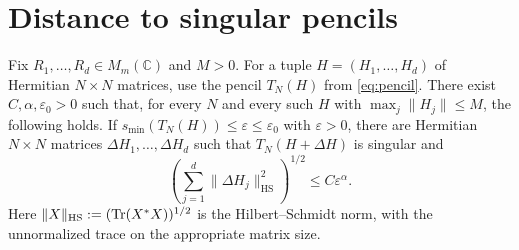 \section{Distance to singular pencils}\label{sec:distance}

\begin{proposition}\label{prop:distance}
Fix $R_1,\ldots,R_d\in M_m(\mathbb C)$ and $M>0$.
For a tuple $H=(H_1,\ldots,H_d)$ of Hermitian $N\times N$ matrices, use the pencil $T_N(H)$ from \eqref{eq:pencil}.
There exist $C,\alpha,\varepsilon_0>0$ such that, for every $N$ and every such $H$ with $\max_j\|H_j\|\le M$, the following holds.
If $s_{\min}(T_N(H))\le\varepsilon\le\varepsilon_0$ with $\varepsilon>0$, there are Hermitian $N\times N$ matrices $\Delta H_1,\ldots,\Delta H_d$ such that $T_N(H+\Delta H)$ is singular and
\begin{equation}\label{eq:perturbation-bound}
 \left(\sum_{j=1}^d\|\Delta H_j\|_{\mathrm{HS}}^2\right)^{1/2}
 \le C\varepsilon^\alpha.
\end{equation}
Here $\|X\|_{\mathrm{HS}}:=(\operatorname{Tr}(X^*X))^{1/2}$ is the Hilbert--Schmidt norm, with the unnormalized trace on the appropriate matrix size.
\end{proposition}

